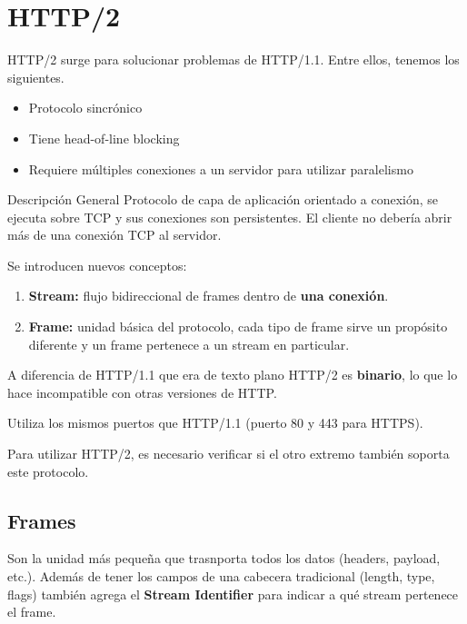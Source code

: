 \section{HTTP/2}

HTTP/2 surge para solucionar problemas de HTTP/1.1. Entre ellos, tenemos los siguientes.

\begin{itemize}[label=\textcolor{acento}{$\bullet$}]
    \item Protocolo sincrónico
    \item Tiene head-of-line blocking
    \item Requiere múltiples conexiones a un servidor para utilizar paralelismo
\end{itemize}

\begin{definicion}{Descripción General}
    Protocolo de capa de aplicación orientado a conexión, se ejecuta sobre TCP y sus conexiones son persistentes. El cliente no debería abrir más de una conexión TCP al servidor.
    
    Se introducen nuevos conceptos:
    \begin{enumerate}
        \item \textbf{Stream:} flujo bidireccional de frames dentro de \textbf{una conexión}.
        \item \textbf{Frame:} unidad básica del protocolo, cada tipo de frame sirve un propósito diferente y un frame pertenece a un stream en particular.
    \end{enumerate}

    A diferencia de HTTP/1.1 que era de texto plano HTTP/2 es \textbf{binario}, lo que lo hace incompatible con otras versiones de HTTP. 

    Utiliza los mismos puertos que HTTP/1.1 (puerto 80 y 443 para HTTPS).
\end{definicion}

Para utilizar HTTP/2, es necesario verificar si el otro extremo también soporta este protocolo.

\subsection{Frames}

Son la unidad más pequeña que trasnporta todos los datos (headers, payload, etc.). Además de tener los campos de una cabecera tradicional (length, type, flags) también agrega el \textbf{Stream Identifier} para indicar a qué stream pertenece el frame. 


